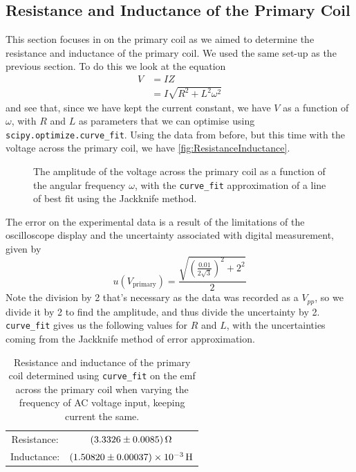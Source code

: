 \documentclass[12pt]{article}
\numberwithin{equation}{section}
\numberwithin{figure}{section}
\numberwithin{table}{section}
\begin{document}
    \subsection{Resistance and Inductance of the Primary Coil}\label{sec:ResistanceInductance}
    This section focuses in on the primary coil as we aimed to determine the resistance and 
    inductance of the primary coil. We used the same set-up as the previous section.
    To do this we look at the equation
    \begin{align*}
        V&=IZ\\
        &=I\sqrt{R^2+L^2\omega^2}
    \end{align*}
    and see that, since we have kept the current constant, we have $V$ as a function of $\omega$, 
    with $R$ and $L$ as parameters that we can optimise using \texttt{scipy.optimize.curve\_fit}. 
    Using the data from before, but this time with the voltage across the primary coil, we have 
    \autoref{fig:ResistanceInductance}.
    \begin{figure}[H]
        \begin{center}
           \caption{The amplitude of the voltage across the primary coil as a function 
           of the angular frequency $\omega$, with the \texttt{curve\_fit} approximation 
           of a line of best fit using the Jackknife method.}
           \label{fig:ResistanceInductance}
        \end{center}
    \end{figure}
    The error on the experimental data is a result of the limitations of the oscilloscope display 
    and the uncertainty associated with digital measurement, given by 
    \begin{equation*}
        u(V_{\text{primary}})=\frac{\sqrt{\left(\frac{0.01}{2\sqrt 3}\right)^2+2^2}}{2}
    \end{equation*}
    Note the division by 2 that's necessary as the data was recorded as a $V_{pp}$, so we divide 
    it by 2 to find the amplitude, and thus divide the uncertainty by 2. \newline
    \texttt{curve\_fit} gives us the following values for $R$ and $L$, with the uncertainties 
    coming from the Jackknife method of error approximation.
    \begin{table}
        \centering
        \begin{tabular}{c c}
            Resistance: & $\SI{3.3326\pm0.0085}{\ohm}$\\
            Inductance: & $\SI{1.50820\pm0.00037e-3}{\henry}$
        \end{tabular}
        \caption{Resistance and inductance of the primary coil determined using 
        \texttt{curve\_fit} on the emf across the primary coil when varying the frequency 
        of AC voltage input, keeping current the same.}
        \label{tbl:ResistanceInductance}
    \end{table}
\end{document}
